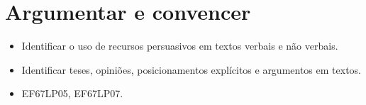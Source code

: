 \pagestyle{port}
\chapter{Argumentar e convencer}


\begin{itemize}

  \item Identificar o uso de recursos persuasivos em textos verbais e não verbais.

  \item Identificar teses, opiniões, posicionamentos explícitos e argumentos em textos.

\end{itemize}


\begin{itemize}

  \item EF67LP05, EF67LP07.

\end{itemize}

